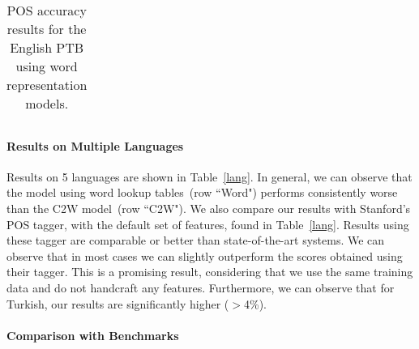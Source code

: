 \documentclass[11pt]{article}
\begin{document}
\begin{CJK*}{UTF8}{gbsn}
\begin{table}
\begin{center}
{\begin{tabular}{c|c|c|c}
\end{tabular}
}
\end{center}
\caption{\label{wsjtest} POS accuracy results for the English PTB using word representation models.}
\end{table}

\paragraph{Results on Multiple Languages}
Results on 5 languages are shown in Table~\ref{lang}. In general, we can observe that the model using word lookup tables~(row ``Word") performs consistently worse than the C2W model~(row ``C2W"). We also compare our results with Stanford's POS tagger, with the default set of features, found in Table~\ref{lang}. Results using these tagger are comparable or better than state-of-the-art systems. We can observe that in most cases we can slightly outperform the scores obtained using their tagger. This is a promising result, considering that we use the same training data and do not handcraft any features.  Furthermore, we can observe that for Turkish, our results are significantly higher ($>$4\%). 

\begin{table}
\begin{center}
\end{center}
\caption{\label{lang} POS accuracies on different languages}
\end{table}

\paragraph{Comparison with Benchmarks}


\end{CJK*}
\end{document}
